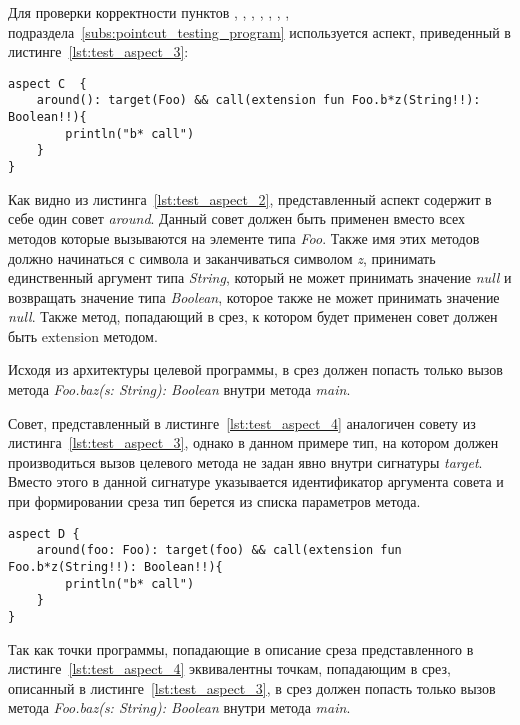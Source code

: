 Для проверки корректности пунктов \quotes{\ref{list:method_name_check}},
\quotes{\ref{list:class_name_check}},
\quotes{\ref{list:method_params_check}},
\quotes{\ref{list:method_modifiers_check}},
\quotes{\ref{list:method_extension_check}},
\quotes{\ref{list:method_return_value_check}},
\quotes{\ref{list:target_check}},
\quotes{\ref{list:logic_operations_check}} подраздела~\ref{subs:pointcut_testing_program} используется аспект, приведенный в листинге~\ref{lst:test_aspect_3}:
\begin{lstlisting}[style={java}, label={lst:test_aspect_3},
  caption={Пример тестового аспекта}]
aspect C  {
    around(): target(Foo) && call(extension fun Foo.b*z(String!!): Boolean!!){
        println("b* call")
    }
}
\end{lstlisting}
Как видно из листинга~\ref{lst:test_aspect_2}, представленный аспект содержит в себе один совет \textit{around}.
Данный совет должен быть применен вместо всех методов которые вызываются на элементе типа \textit{Foo}.
Также имя этих методов должно начинаться с символа  и заканчиваться символом \textit{z}, принимать единственный аргумент типа \textit{String}, который не может принимать значение \textit{null} и возвращать значение типа \textit{Boolean}, которое также не может принимать значение \textit{null}.
Также метод, попадающий в срез, к котором будет применен совет должен быть extension методом.

Исходя из архитектуры целевой программы, в срез должен попасть только вызов метода \textit{Foo.baz(s: String): Boolean} внутри метода \textit{main}.

Совет, представленный в листинге~\ref{lst:test_aspect_4} аналогичен совету из листинга~\ref{lst:test_aspect_3}, однако в данном примере тип, на котором должен производиться вызов целевого метода не задан явно внутри сигнатуры \textit{target}.
Вместо этого в данной сигнатуре указывается идентификатор аргумента совета и при формировании среза тип берется из списка параметров метода.
\begin{lstlisting}[style={java}, label={lst:test_aspect_4},
  caption={Пример тестового аспекта}]
aspect D {
    around(foo: Foo): target(foo) && call(extension fun Foo.b*z(String!!): Boolean!!){
        println("b* call")
    }
}
\end{lstlisting}
Так как точки программы, попадающие в описание среза представленного в листинге~\ref{lst:test_aspect_4} эквивалентны точкам, попадающим в срез, описанный в листинге~\ref{lst:test_aspect_3}, в срез должен попасть только вызов метода \textit{Foo.baz(s: String): Boolean} внутри метода \textit{main}.

